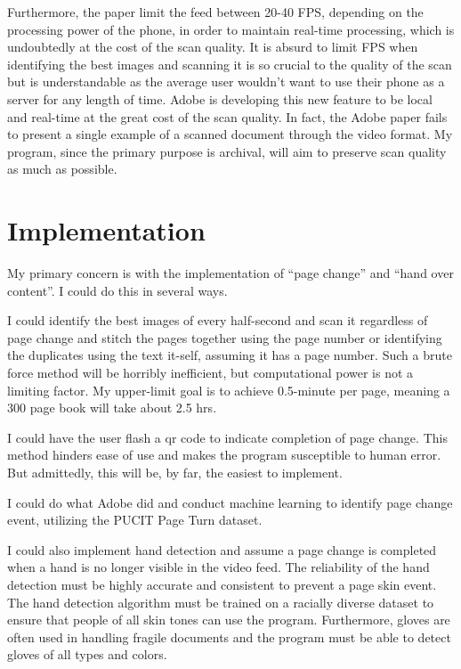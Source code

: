 \documentclass[10pt,twocolumn]{article}
\begin{document}
Furthermore, the paper limit the feed between 20-40 FPS, depending on the processing power of the phone, in order to maintain real-time processing, which is undoubtedly at the cost of the scan quality. It is absurd to limit FPS when identifying the best images and scanning it is so crucial to the quality of the scan but is understandable as the average user wouldn’t want to use their phone as a server for any length of time. Adobe is developing this new feature to be local and real-time at the great cost of the scan quality. In fact, the Adobe paper fails to present a single example of a scanned document through the video format. My program, since the primary purpose is archival, will aim to preserve scan quality as much as possible.\newline


\section{Implementation}

My primary concern is with the implementation of “page change” and “hand over content”\cite{wigington2024}. I could do this in several ways.\newline

I could identify the best images of every half-second and scan it regardless of page change and stitch the pages together using the page number or identifying the duplicates using the text it-self, assuming it has a page number. Such a brute force method will be horribly inefficient, but computational power is not a limiting factor. My upper-limit goal is to achieve 0.5-minute per page, meaning a 300 page book will take about 2.5 hrs.\newline

I could have the user flash a qr code to indicate completion of page change. This method hinders ease of use and makes the program susceptible to human error. But admittedly, this will be, by far, the easiest to implement.\newline

I could do what Adobe did and conduct machine learning to identify page change event, utilizing the PUCIT Page Turn dataset.\newline

I could also implement hand detection and assume a page change is completed when a hand is no longer visible in the video feed. The reliability of the hand detection must be highly accurate and consistent to prevent a page skin event. The hand detection algorithm must be trained on a racially diverse dataset to ensure that people of all skin tones can use the program. Furthermore, gloves are often used in handling fragile documents and the program must be able to detect gloves of all types and colors.\newline
\end{document}
